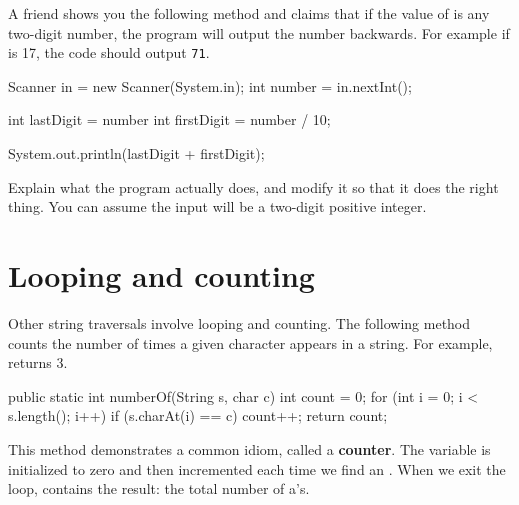 \begin{exercise}

A friend shows you the following method and claims that if the value of  is any two-digit number, the program will output the number backwards.
For example if  is 17, the code should output {\tt 71}.

\begin{code}
Scanner in = new Scanner(System.in);
int number = in.nextInt();

int lastDigit = number %
int firstDigit = number / 10;

System.out.println(lastDigit + firstDigit);
\end{code}

Explain what the program actually does, and modify it so that it does the right thing.
You can assume the input will be a two-digit positive integer.

\end{exercise}


\section{Looping and counting}
\label{loopcount}


Other string traversals involve looping and counting.
The following method counts the number of times a given character appears in a string.
For example,  returns 3.

\begin{code}
public static int numberOf(String s, char c) {
    int count = 0;
    for (int i = 0; i < s.length(); i++) {
        if (s.charAt(i) == c) {
            count++;
        }
    }
    return count;
}
\end{code}


This method demonstrates a common idiom, called a {\bf counter}.
The variable  is initialized to zero and then incremented each time we find an .
When we exit the loop,  contains the result: the total number of a's.


